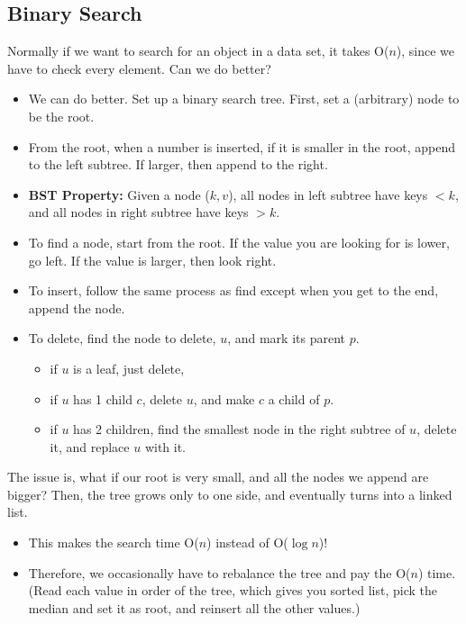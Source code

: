 \documentclass[10pt]{article}
\begin{document}
\subsection*{Binary Search}
Normally if we want to search for an object in a data set, it takes O($n$), since we have to check every element.  Can we do better?
\begin{itemize}
	\item We can do better.  Set up a binary search tree.  First, set a (arbitrary) node to be the root.
	\item From the root, when a number is inserted, if it is smaller in the root, append to the left subtree.  If larger, then append to the right.
	\item \textbf{BST Property:} Given a node ($k, v$), all nodes in left subtree have keys $< k$, and all nodes in right subtree have keys $> k$.
	\item To find a node, start from the root.  If the value you are looking for is lower, go left.  If the value is larger, then look right.
	\item To insert, follow the same process as find except when you get to the end, append the node.
	\item To delete, find the node to delete, $u$, and mark its parent $p$.
	\begin{itemize}
	    \item if $u$ is a leaf, just delete,
	    \item if $u$ has 1 child $c$, delete $u$, and make $c$ a child of $p$.
	    \item if $u$ has 2 children, find the smallest node in the right subtree of $u$, delete it, and replace $u$ with it.
    \end{itemize}
\end{itemize}
The issue is, what if our root is very small, and all the nodes we append are bigger?  Then, the tree grows only to one side, and eventually turns into a linked list.
\begin{itemize}
	\item This makes the search time O($n$) instead of O($\log n$)!
	\item Therefore, we occasionally have to rebalance the tree and pay the O($n$) time.  (Read each value in order of the tree, which gives you sorted list, pick the median and set it as root, and reinsert all the other values.)
\end{itemize}
\end{document}
